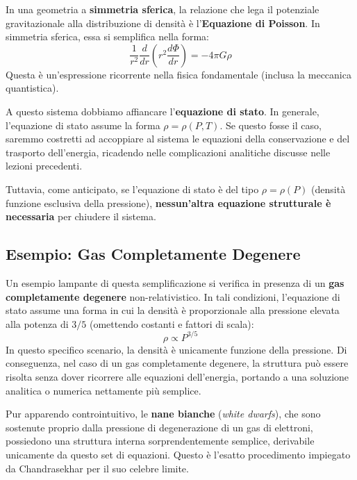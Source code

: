 In una geometria a \textbf{simmetria sferica}, la relazione che lega il potenziale gravitazionale alla distribuzione di densità è l'\textbf{Equazione di Poisson}. In simmetria sferica, essa si semplifica nella forma:
\begin{equation}
\frac{1}{r^2} \frac{d}{dr} \left( r^2 \frac{d\Phi}{dr} \right) = - 4 \pi G \rho
\end{equation}
Questa è un'espressione ricorrente nella fisica fondamentale (inclusa la meccanica quantistica).

A questo sistema dobbiamo affiancare l'\textbf{equazione di stato}. In generale, l'equazione di stato assume la forma $\rho = \rho(P, T)$. Se questo fosse il caso, saremmo costretti ad accoppiare al sistema le equazioni della conservazione e del trasporto dell'energia, ricadendo nelle complicazioni analitiche discusse nelle lezioni precedenti.

Tuttavia, come anticipato, se l'equazione di stato è del tipo $\rho = \rho(P)$ (densità funzione esclusiva della pressione), \textbf{nessun'altra equazione strutturale è necessaria} per chiudere il sistema.

\subsection{Esempio: Gas Completamente Degenere}

Un esempio lampante di questa semplificazione si verifica in presenza di un \textbf{gas completamente degenere} non-relativistico. In tali condizioni, l'equazione di stato assume una forma in cui la densità è proporzionale alla pressione elevata alla potenza di $3/5$ (omettendo costanti e fattori di scala):
\begin{equation}
\rho \propto P^{3/5}
\end{equation}
In questo specifico scenario, la densità è unicamente funzione della pressione. Di conseguenza, nel caso di un gas completamente degenere, la struttura può essere risolta senza dover ricorrere alle equazioni dell'energia, portando a una soluzione analitica o numerica nettamente più semplice.

Pur apparendo controintuitivo, le \textbf{nane bianche} (\textit{white dwarfs}), che sono sostenute proprio dalla pressione di degenerazione di un gas di elettroni, possiedono una struttura interna sorprendentemente semplice, derivabile unicamente da questo set di equazioni. Questo è l'esatto procedimento impiegato da Chandrasekhar per il suo celebre limite.

